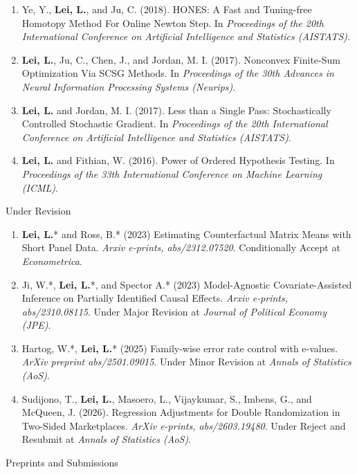 \documentclass{article}
\begin{document}
\begin{enumerate}
\item Ye, Y., \textbf{Lei, L.}, and Ju, C. (2018). HONES: A Fast and Tuning-free Homotopy Method For Online Newton Step. In \emph{Proceedings of the 20th International Conference on Artificial Intelligence and Statistics (AISTATS)}.
\item \textbf{Lei, L.}, Ju, C., Chen, J., and Jordan, M. I. (2017). Nonconvex Finite-Sum Optimization Via SCSG Methods. In \emph{Proceedings of the 30th Advances in Neural Information Processing Systems (Neurips)}.
\item \textbf{Lei, L.} and Jordan, M. I. (2017). Less than a Single Pass: Stochastically Controlled Stochastic Gradient. In \emph{Proceedings of the 20th International Conference on Artificial Intelligence and Statistics (AISTATS)}.
\item \textbf{Lei, L.} and Fithian, W. (2016). Power of Ordered Hypothesis Testing. In \emph{Proceedings of the 33th International Conference on Machine Learning (ICML)}.
\end{enumerate}

\begin{large}
\noindent Under Revision
\end{large}

\begin{enumerate}
\item \textbf{Lei, L.}* and Ross, B.* (2023) Estimating Counterfactual Matrix Means with Short Panel Data. \emph{Arxiv e-prints, abs/2312.07520}. Conditionally Accept at \emph{Econometrica}.
\item Ji, W.*, \textbf{Lei, L.}*, and Spector A.* (2023) Model-Agnostic Covariate-Assisted Inference on Partially Identified Causal Effects. \emph{Arxiv e-prints, abs/2310.08115}. Under Major Revision at \emph{Journal of Political Economy (JPE)}.
\item Hartog, W.*, \textbf{Lei, L.}* (2025) Family-wise error rate control with e-values. \emph{ArXiv preprint abs/2501.09015}. Under Minor Revision at \emph{Annals of Statistics (AoS)}.
\item Sudijono, T., \textbf{Lei, L.}, Masoero, L., Vijaykumar, S., Imbens, G., and McQueen, J. (2026). Regression Adjustments for Double Randomization in Two-Sided Marketplaces. \emph{ArXiv e-prints, abs/2603.19480}. Under Reject and Resubmit at \emph{Annals of Statistics (AoS)}.
\end{enumerate}

\begin{large}
\noindent Preprints and Submissions
\end{large}
\end{document}
